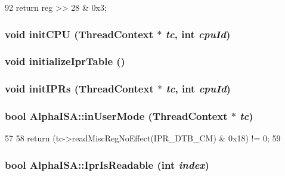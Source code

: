 \begin{DoxyCode}
92 { return reg >> 28 & 0x3; }
\end{DoxyCode}
\hypertarget{namespaceAlphaISA_aded557a1e716c6f849b0e0b05fc77676}{
\subsubsection[{initCPU}]{\setlength{\rightskip}{0pt plus 5cm}void initCPU ({\bf ThreadContext} $\ast$ {\em tc}, \/  int {\em cpuId})}}
\label{namespaceAlphaISA_aded557a1e716c6f849b0e0b05fc77676}
\hypertarget{namespaceAlphaISA_abc1bf54037f3c4812019fa985607bbd2}{
\subsubsection[{initializeIprTable}]{\setlength{\rightskip}{0pt plus 5cm}void initializeIprTable ()}}
\label{namespaceAlphaISA_abc1bf54037f3c4812019fa985607bbd2}
\hypertarget{namespaceAlphaISA_a69ad890f318cd923f9a65897a06cbf50}{
\subsubsection[{initIPRs}]{\setlength{\rightskip}{0pt plus 5cm}void initIPRs ({\bf ThreadContext} $\ast$ {\em tc}, \/  int {\em cpuId})}}
\label{namespaceAlphaISA_a69ad890f318cd923f9a65897a06cbf50}
\hypertarget{namespaceAlphaISA_a166daa198f05f80c18b5249f18a0675e}{
\subsubsection[{inUserMode}]{\setlength{\rightskip}{0pt plus 5cm}bool AlphaISA::inUserMode ({\bf ThreadContext} $\ast$ {\em tc})}}
\label{namespaceAlphaISA_a166daa198f05f80c18b5249f18a0675e}



\begin{DoxyCode}
57 {
58     return (tc->readMiscRegNoEffect(IPR_DTB_CM) & 0x18) != 0;
59 }
\end{DoxyCode}
\hypertarget{namespaceAlphaISA_a7d31db1cc7ca61db4f288b9e525922e1}{
\subsubsection[{IprIsReadable}]{\setlength{\rightskip}{0pt plus 5cm}bool AlphaISA::IprIsReadable (int {\em index})}}
\label{namespaceAlphaISA_a7d31db1cc7ca61db4f288b9e525922e1}



